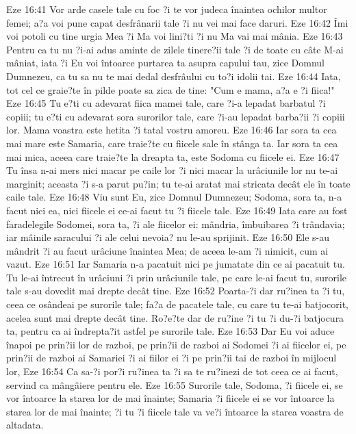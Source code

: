 Eze 16:41  Vor arde casele tale cu foc ?i te vor judeca înaintea ochilor multor femei; a?a voi pune capat desfrânarii tale ?i nu vei mai face daruri.
Eze 16:42  Îmi voi potoli cu tine urgia Mea ?i Ma voi lini?ti ?i nu Ma vai mai mânia.
Eze 16:43  Pentru ca tu nu ?i-ai adus aminte de zilele tinere?ii tale ?i de toate cu câte M-ai mâniat, iata ?i Eu voi întoarce purtarea ta asupra capului tau, zice Domnul Dumnezeu, ca tu sa nu te mai dedal desfrâului cu to?i idolii tai.
Eze 16:44  Iata, tot cel ce graie?te în pilde poate sa zica de tine: "Cum e mama, a?a e ?i fiica!"
Eze 16:45  Tu e?ti cu adevarat fiica mamei tale, care ?i-a lepadat barbatul ?i copiii; tu e?ti cu adevarat sora surorilor tale, care ?i-au lepadat barba?ii ?i copiii lor. Mama voastra este hetita ?i tatal vostru amoreu.
Eze 16:46  Iar sora ta cea mai mare este Samaria, care traie?te cu fiicele sale în stânga ta. Iar sora ta cea mai mica, aceea care traie?te la dreapta ta, este Sodoma cu fiicele ei.
Eze 16:47  Tu însa n-ai mers nici macar pe caile lor ?i nici macar la urâciunile lor nu te-ai marginit; aceasta ?i s-a parut pu?in; tu te-ai aratat mai stricata decât ele în toate caile tale.
Eze 16:48  Viu sunt Eu, zice Domnul Dumnezeu; Sodoma, sora ta, n-a facut nici ea, nici fiicele ei ce-ai facut tu ?i fiicele tale.
Eze 16:49  Iata care au fost faradelegile Sodomei, sora ta, ?i ale fiicelor ei: mândria, îmbuibarea ?i trândavia; iar mâinile saracului ?i ale celui nevoia? nu le-au sprijinit.
Eze 16:50  Ele s-au mândrit ?i au facut urâciune înaintea Mea; de aceea le-am ?i nimicit, cum ai vazut.
Eze 16:51  Iar Samaria n-a pacatuit nici pe jumatate din ce ai pacatuit tu. Tu le-ai întrecut în urâciuni ?i prin urâciunile tale, pe care le-ai facut tu, surorile tale s-au dovedit mai drepte decât tine.
Eze 16:52  Poarta-?i dar ru?inea ta ?i tu, ceea ce osândeai pe surorile tale; fa?a de pacatele tale, cu care tu te-ai batjocorit, acelea sunt mai drepte decât tine. Ro?e?te dar de ru?ine ?i tu ?i du-?i batjocura ta, pentru ca ai îndrepta?it astfel pe surorile tale.
Eze 16:53  Dar Eu voi aduce înapoi pe prin?ii lor de razboi, pe prin?ii de razboi ai Sodomei ?i ai fiicelor ei, pe prin?ii de razboi ai Samariei ?i ai fiilor ei ?i pe prin?ii tai de razboi în mijlocul lor,
Eze 16:54  Ca sa-?i por?i ru?inea ta ?i sa te ru?inezi de tot ceea ce ai facut, servind ca mângâiere pentru ele.
Eze 16:55  Surorile tale, Sodoma, ?i fiicele ei, se vor întoarce la starea lor de mai înainte; Samaria ?i fiicele ei se vor întoarce la starea lor de mai înainte; ?i tu ?i fiicele tale va ve?i întoarce la starea voastra de altadata.
